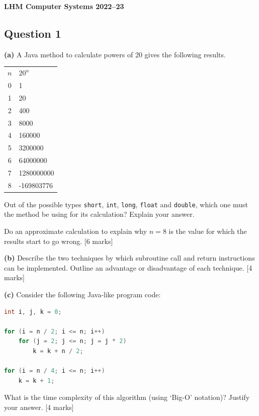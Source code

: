 \textbf{LHM Computer Systems 2022--23}
\subsection{Question 1}
\textbf{(a)}
A Java method to calculate powers of 20 gives the following results.

\begin{center}
\begin{tabular}{cl}
$n$ & $20^n$ \\
0 & 1 \\
1 & 20 \\
2 & 400 \\
3 & 8000 \\
4 & 160000 \\
5 & 3200000 \\
6 & 64000000 \\
7 & 1280000000 \\
8 & -169803776 \\
\end{tabular}
\end{center}
Out of the possible types \texttt{short}, \texttt{int}, \texttt{long}, \texttt{float} and \texttt{double}, which one must the method be using for its calculation? Explain your answer.

Do an approximate calculation to explain why $n = 8$ is the value for which the results start to go wrong. \hfill [6 marks]

\textbf{(b)}
Describe the two techniques by which subroutine call and return instructions can be implemented. Outline an advantage or disadvantage of each technique. \hfill [4 marks]

\textbf{(c)}
Consider the following Java-like program code:

\begin{lstlisting}[language=Java]
int i, j, k = 0;

for (i = n / 2; i <= n; i++)
    for (j = 2; j <= n; j = j * 2)
        k = k + n / 2;

for (i = n / 4; i <= n; i++)
    k = k + 1;
\end{lstlisting}

What is the time complexity of this algorithm (using ‘Big-O’ notation)? Justify your answer. \hfill [4 marks]

